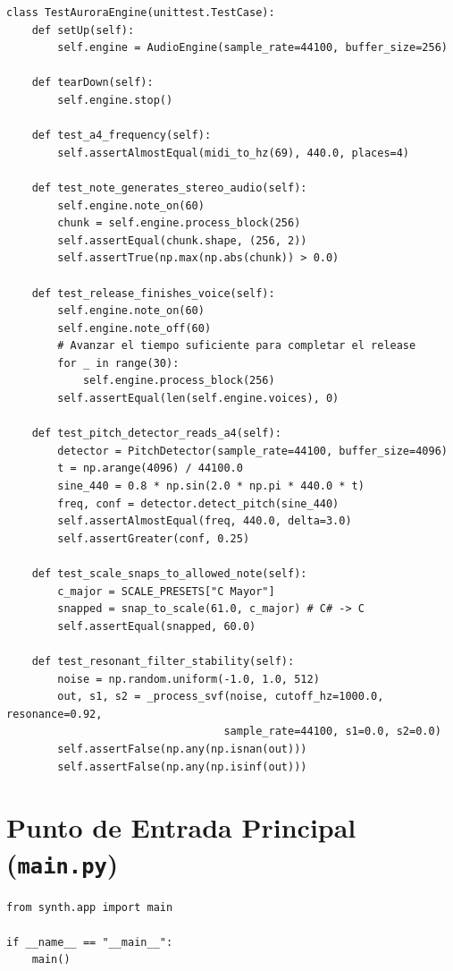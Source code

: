 \documentclass[11pt,a4paper]{article}
\begin{document}
\begin{lstlisting}
class TestAuroraEngine(unittest.TestCase):
    def setUp(self):
        self.engine = AudioEngine(sample_rate=44100, buffer_size=256)

    def tearDown(self):
        self.engine.stop()

    def test_a4_frequency(self):
        self.assertAlmostEqual(midi_to_hz(69), 440.0, places=4)

    def test_note_generates_stereo_audio(self):
        self.engine.note_on(60)
        chunk = self.engine.process_block(256)
        self.assertEqual(chunk.shape, (256, 2))
        self.assertTrue(np.max(np.abs(chunk)) > 0.0)

    def test_release_finishes_voice(self):
        self.engine.note_on(60)
        self.engine.note_off(60)
        # Avanzar el tiempo suficiente para completar el release
        for _ in range(30):
            self.engine.process_block(256)
        self.assertEqual(len(self.engine.voices), 0)

    def test_pitch_detector_reads_a4(self):
        detector = PitchDetector(sample_rate=44100, buffer_size=4096)
        t = np.arange(4096) / 44100.0
        sine_440 = 0.8 * np.sin(2.0 * np.pi * 440.0 * t)
        freq, conf = detector.detect_pitch(sine_440)
        self.assertAlmostEqual(freq, 440.0, delta=3.0)
        self.assertGreater(conf, 0.25)

    def test_scale_snaps_to_allowed_note(self):
        c_major = SCALE_PRESETS["C Mayor"]
        snapped = snap_to_scale(61.0, c_major) # C# -> C
        self.assertEqual(snapped, 60.0)

    def test_resonant_filter_stability(self):
        noise = np.random.uniform(-1.0, 1.0, 512)
        out, s1, s2 = _process_svf(noise, cutoff_hz=1000.0, resonance=0.92,
                                  sample_rate=44100, s1=0.0, s2=0.0)
        self.assertFalse(np.any(np.isnan(out)))
        self.assertFalse(np.any(np.isinf(out)))
\end{lstlisting}

\section{Punto de Entrada Principal (\texttt{main.py})}

\begin{lstlisting}
from synth.app import main

if __name__ == "__main__":
    main()
\end{lstlisting}
\end{document}
